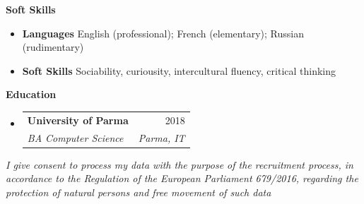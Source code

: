 \documentclass[letterpaper,12pt]{article}[leftmargin=*]
\makeatletter
\def \entryspacing {-0pt}
\renewcommand{\section}[2]{\vspace{5pt}
  \colorbox{secondary}{\color{white}\raggedbottom\normalsize\textbf{{#1}{\hspace{7pt}#2}}}
}
\newcommand{\resumeEntryStart}{\begin{itemize}[leftmargin=2.5mm]}
\newcommand{\resumeEntryEnd}{\end{itemize}\vspace{\entryspacing}}
\newcommand{\resumeEntryTSDL}[4]{
  \vspace{-1pt}\item[]
    \begin{tabularx}{0.97\textwidth}{X@{\hspace{60pt}}r}
      \textbf{\color{primary}#1} & {\firabook\color{accent}\small#2} \\
      \textit{\color{accent}\small#3} & \textit{\color{accent}\small#4} \\
    \end{tabularx}\vspace{-6pt}
}
\newcommand{\resumeEntryS}[2]{
  \item[]\small{
    \textbf{\color{primary}#1 }{ #2 \vspace{-6pt}}
  }
}
\makeatother
\begin{document}
\section{\faBook}{Soft Skills}
\resumeEntryStart
 \resumeEntryS{Languages }{English (professional); French (elementary); Russian (rudimentary)}
 \resumeEntryS{Soft Skills } {Sociability, curiousity, intercultural fluency, critical thinking}
\resumeEntryEnd

\section{\faGraduationCap}{Education}

  \resumeEntryStart
    \resumeEntryTSDL
      {University of Parma}{2018}
      {BA Computer Science}{Parma, IT}
  \resumeEntryEnd


\vspace*{\fill}
\textit{\scriptsize I give consent to process my data with the purpose of the recruitment process, in accordance to the Regulation of the European Parliament 679/2016, regarding the protection of natural persons and free movement of such data}
\end{document}
